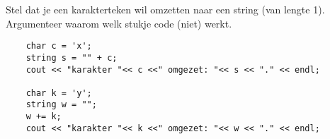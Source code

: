 \beginoef
Stel dat je een karakterteken wil omzetten naar een string (van lengte 1). Argumenteer waarom welk stukje code (niet) werkt.
\begin{verbatim}
	char c = 'x';
	string s = "" + c;
	cout << "karakter "<< c <<" omgezet: "<< s << "." << endl;

	char k = 'y';
	string w = "";
	w += k;
	cout << "karakter "<< k <<" omgezet: "<< w << "." << endl;
\end{verbatim}
\endoef
